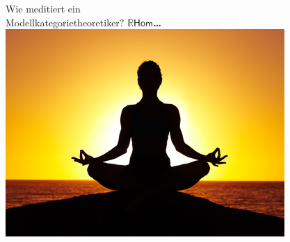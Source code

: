 \documentclass[a4paper,ngerman,landscape,30pt]{scrartcl}
\begin{document}
\begin{center}
  \huge\sffamily
  Wie meditiert ein \\ Modellkategorietheoretiker?
  \textbf{\phantom{\ldots}$\mathbb{R}\boldsymbol{\mathsf{Hom}}$\ldots}
  \vfill
  \includegraphics[scale=0.7]{images/meditation}
\end{center}
\newpage
\end{document}
